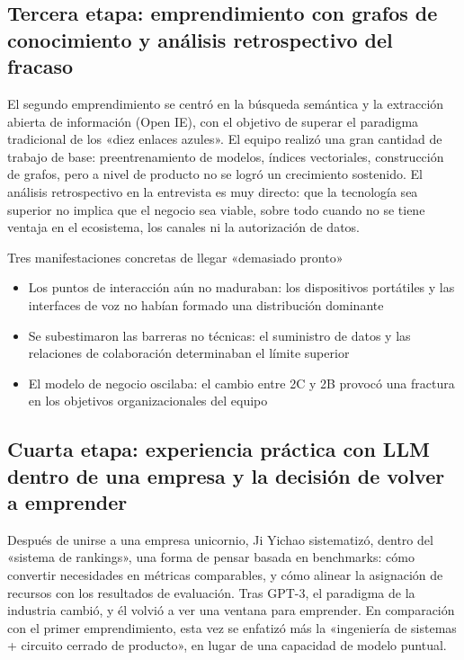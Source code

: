 \documentclass[a4paper]{article}
\begin{document}
\subsection{Tercera etapa: emprendimiento con grafos de conocimiento y análisis retrospectivo del fracaso}

El segundo emprendimiento se centró en la búsqueda semántica y la extracción abierta de información (Open IE), con el objetivo de superar el paradigma tradicional de los «diez enlaces azules». El equipo realizó una gran cantidad de trabajo de base: preentrenamiento de modelos, índices vectoriales, construcción de grafos, pero a nivel de producto no se logró un crecimiento sostenido. El análisis retrospectivo en la entrevista es muy directo: que la tecnología sea superior no implica que el negocio sea viable, sobre todo cuando no se tiene ventaja en el ecosistema, los canales ni la autorización de datos.

\begin{warningbox}{Tres manifestaciones concretas de llegar «demasiado pronto»}
\begin{itemize}
    \item Los puntos de interacción aún no maduraban: los dispositivos portátiles y las interfaces de voz no habían formado una distribución dominante
    \item Se subestimaron las barreras no técnicas: el suministro de datos y las relaciones de colaboración determinaban el límite superior
    \item El modelo de negocio oscilaba: el cambio entre 2C y 2B provocó una fractura en los objetivos organizacionales del equipo
\end{itemize}
\end{warningbox}

\subsection{Cuarta etapa: experiencia práctica con LLM dentro de una empresa y la decisión de volver a emprender}

Después de unirse a una empresa unicornio, Ji Yichao sistematizó, dentro del «sistema de rankings», una forma de pensar basada en benchmarks: cómo convertir necesidades en métricas comparables, y cómo alinear la asignación de recursos con los resultados de evaluación. Tras GPT-3, el paradigma de la industria cambió, y él volvió a ver una ventana para emprender. En comparación con el primer emprendimiento, esta vez se enfatizó más la «ingeniería de sistemas + circuito cerrado de producto», en lugar de una capacidad de modelo puntual.
\end{document}
